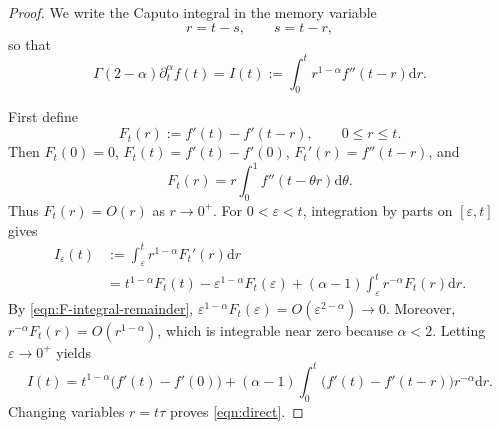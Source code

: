 \documentclass[preprint,3p,times]{elsarticle}
\def\dta{\partial_t^\alpha}
\def\d{\mathrm{d}}
\begin{document}
\begin{proof}
We write the Caputo integral in the memory variable
\[
    r=t-s,\qquad s=t-r,
\]
so that
\begin{equation}\label{eqn:I-def}
    \Gamma(2-\alpha)\dta f(t)
    = I(t):=\int_0^t r^{1-\alpha} f''(t-r)\d r .
\end{equation}

First define
\[
    F_t(r):=f'(t)-f'(t-r),\qquad 0\le r\le t .
\]
Then $F_t(0)=0$, $F_t(t)=f'(t)-f'(0)$, $F_t'(r)=f''(t-r)$, and
\begin{equation}\label{eqn:F-integral-remainder}
    F_t(r)=r\int_0^1 f''(t-\theta r)\d\theta .
\end{equation}
Thus $F_t(r)=O(r)$ as $r\to0^+$. For $0<\varepsilon<t$, integration by parts on $[\varepsilon,t]$ gives
\begin{align*}
I_\varepsilon(t)
&:=\int_\varepsilon^t r^{1-\alpha}F_t'(r)\d r  \\
&=t^{1-\alpha}F_t(t)-\varepsilon^{1-\alpha}F_t(\varepsilon)
+(\alpha-1)\int_\varepsilon^t r^{-\alpha}F_t(r)\d r .
\end{align*}
By \eqref{eqn:F-integral-remainder}, $\varepsilon^{1-\alpha}F_t(\varepsilon)=O(\varepsilon^{2-\alpha})\to0$. Moreover, $r^{-\alpha}F_t(r)=O(r^{1-\alpha})$, which is integrable near zero because $\alpha<2$. Letting $\varepsilon\to0^+$ yields
\begin{equation}\label{eqn:direct-r}
I(t)=t^{1-\alpha}\bigl(f'(t)-f'(0)\bigr)
+(\alpha-1)\int_0^t\bigl(f'(t)-f'(t-r)\bigr)r^{-\alpha}\d r .
\end{equation}
Changing variables $r=t\tau$ proves \eqref{eqn:direct}.


\end{proof}
\end{document}

